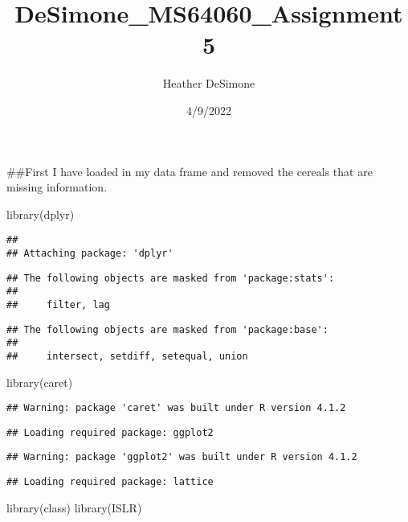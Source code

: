 \documentclass[
]{article}
\title{DeSimone\_MS64060\_Assignment 5}
\author{Heather DeSimone}
\date{4/9/2022}
\newenvironment{Shaded}{\begin{snugshade}}{\end{snugshade}}
\newcommand{\FunctionTok}[1]{\textcolor[rgb]{0.00,0.00,0.00}{#1}}
\newcommand{\NormalTok}[1]{#1}
\begin{document}
\maketitle

\#\#First I have loaded in my data frame and removed the cereals that
are missing information.

\begin{Shaded}
\begin{Highlighting}[]
\FunctionTok{library}\NormalTok{(dplyr)}
\end{Highlighting}
\end{Shaded}

\begin{verbatim}
## 
## Attaching package: 'dplyr'
\end{verbatim}

\begin{verbatim}
## The following objects are masked from 'package:stats':
## 
##     filter, lag
\end{verbatim}

\begin{verbatim}
## The following objects are masked from 'package:base':
## 
##     intersect, setdiff, setequal, union
\end{verbatim}

\begin{Shaded}
\begin{Highlighting}[]
\FunctionTok{library}\NormalTok{(caret)}
\end{Highlighting}
\end{Shaded}

\begin{verbatim}
## Warning: package 'caret' was built under R version 4.1.2
\end{verbatim}

\begin{verbatim}
## Loading required package: ggplot2
\end{verbatim}

\begin{verbatim}
## Warning: package 'ggplot2' was built under R version 4.1.2
\end{verbatim}

\begin{verbatim}
## Loading required package: lattice
\end{verbatim}

\begin{Shaded}
\begin{Highlighting}[]
\FunctionTok{library}\NormalTok{(class)}
\FunctionTok{library}\NormalTok{(ISLR)}
\end{Highlighting}
\end{Shaded}
\end{document}
